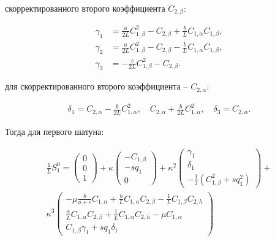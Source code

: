 скорректированного второго коэффициента $C_{2,\beta}$:

\begin{equation}
\begin{aligned}
	\gamma_1 & = \frac{a}{2L}C^2_{1,\beta} - C_{2,\beta} + \frac{b}{L}C_{1,\alpha}C_{1,\beta}, \\
	\gamma_2 & = \frac{a}{2L}C^2_{1,\beta} - C_{2,\beta} - \frac{b}{L}C_{1,\alpha}C_{1,\beta}, \\
	\gamma_3 & = -\frac{c}{2L}C^2_{1,\beta} - C_{2,\beta}.
\end{aligned}
\end{equation}

для скорректированного второго коэффициента -- $C_{2,\alpha}$:

\begin{equation}
\begin{aligned}
	\delta_1 = C_{2,\alpha} - \frac{b}{2L}C^2_{1,\alpha},\quad C_{2,\alpha} + \frac{b}{2L}C^2_{1,\alpha},\quad \delta_3 = C_{2,\alpha}.
\end{aligned}
\end{equation}

Тогда для первого шатуна:

\begin{equation}
\begin{aligned}
	\frac{1}{L}S_1^0 = \begin{pmatrix} 0 \\ 0 \\ 1\end{pmatrix} + \kappa\begin{pmatrix}-C_{1,\beta} \\ -sq_1 \\ 0 \end{pmatrix} + \kappa^2\begin{pmatrix}\gamma_1 \\ \delta_1 \\ -\frac{1}{2}\left(C^2_{1,\beta} + sq^2_1\right)\end{pmatrix} + \\ \kappa^3\begin{pmatrix}
	-\mu \frac{b}{a+c}C_{1,\alpha} + \frac{b}{L}C_{1,\alpha}C_{2,\beta} - \frac{1}{L}C_{1,\beta}C_{2,h}\\
	\frac{a}{L}C_{1,\alpha}C_{2,\beta} + \frac{1}{L}C_{1,\alpha}C_{2,h} - \mu C_{1,\alpha} \\
	C_{1,\beta}\gamma_1 + sq_1\delta_1
	\end{pmatrix}
\end{aligned}
\end{equation}

